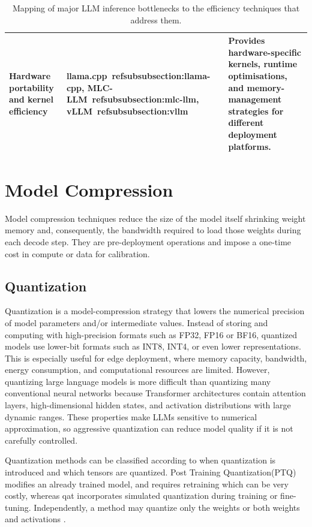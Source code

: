 \begin{table}[h]
\begin{tabularx}{\textwidth}{
        >{\raggedright\arraybackslash}p{}
        >{\raggedright\arraybackslash}p{}
        >{\raggedright\arraybackslash}X
    }
        \addlinespace

        Hardware portability and kernel efficiency
        & llama.cpp~ref{subsubsection:llama-cpp}, MLC-LLM~ref{subsubsection:mlc-llm}, vLLM~ref{subsubsection:vllm}
        & Provides hardware-specific kernels, runtime optimisations, and
        memory-management strategies for different deployment platforms. \\

        \bottomrule
    \end{tabularx}

    \centering
    \caption{Mapping of major LLM inference bottlenecks to the efficiency
    techniques that address them.}
    \label{tab:bottleneck-technique-map}
\end{table}


\section{Model Compression}\label{sec:model-level}

Model compression techniques reduce the size of the model itself shrinking weight memory and, consequently, the bandwidth required to load those weights during each decode step. They are pre-deployment operations and impose a one-time cost in compute or data for calibration.

\subsection{Quantization}\label{sec:quantization}

Quantization is a model-compression strategy that lowers the numerical precision of model parameters and/or intermediate values. Instead of storing and computing with high-precision formats such as FP32, FP16 or BF16, quantized models use lower-bit formats such as INT8, INT4, or even lower representations. This is especially useful for edge deployment, where memory capacity, bandwidth, energy consumption, and computational resources are limited. However, quantizing large language models is more difficult than quantizing many conventional neural networks because Transformer architectures contain attention layers, high-dimensional hidden states, and activation distributions with large dynamic ranges. These properties make LLMs sensitive to numerical approximation, so aggressive quantization can reduce model quality if it is not carefully controlled. \cite{yue2024reviewonedge}

Quantization methods can be classified according to when quantization is introduced and which tensors are quantized. Post Training Quantization(PTQ) modifies an already trained model, and requires retraining which can be very costly, whereas \ac{qat} incorporates simulated quantization during training or fine-tuning. Independently, a method may quantize only the weights or both weights and activations \cite{zhou2024efficientinf}.



